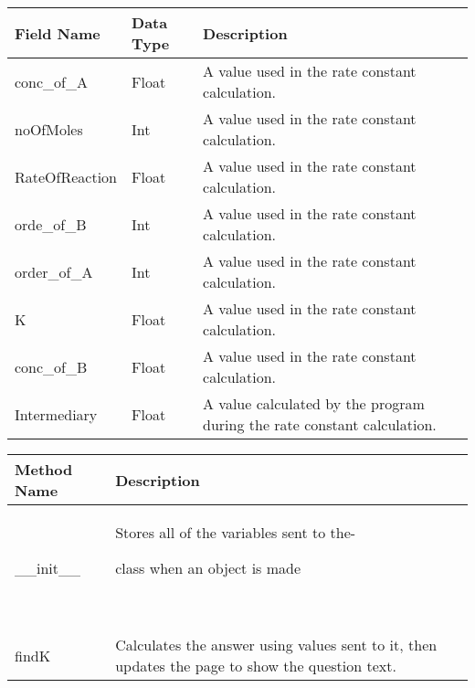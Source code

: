 \documentclass[letterpaper]{article}
\title{}
\author{}
\date{2015-04-01}
\begin{document}
\begin{center}
\tablefirsthead{}
\tablehead{}
\tabletail{}
\tablelasttail{}
\begin{supertabular}{|m{2.22956in}|m{2.22956in}|m{2.22956in}|}
\hline
Field Name &
Data Type &
Description\\\hline
conc\_of\_A  &
Float  &
A value used in the rate constant calculation.\\\hline
noOfMoles  &
Int &
A value used in the rate constant calculation.\\\hline
RateOfReaction &
Float  &
A value used in the rate constant calculation.\\\hline
orde\_of\_B  &
Int &
A value used in the rate constant calculation.\\\hline
order\_of\_A &
Int &
A value used in the rate constant calculation.\\\hline
K &
Float &
A value used in the rate constant calculation.\\\hline
conc\_of\_B  &
Float  &
A value used in the rate constant calculation.\\\hline
Intermediary &
Float &
A value calculated by the program during the rate constant calculation.\\\hline
\end{supertabular}
\end{center}

\bigskip


\bigskip

\begin{center}
\tablefirsthead{}
\tablehead{}
\tabletail{}
\tablelasttail{}
\begin{supertabular}{|m{3.38376in}|m{3.38376in}|}
\hline
Method Name &
Description\\\hline
\_\_init\_\_ &
Stores all of the variables sent to the-

class when an object is made

~
\\\hline
findK &
Calculates the answer using values sent to it, then updates the page to show the question text.\\\hline
\end{supertabular}
\end{center}

\bigskip
\end{document}
